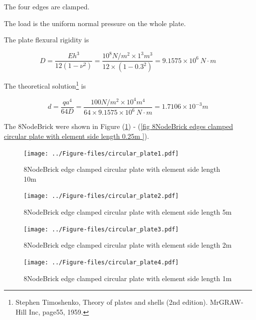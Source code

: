 \documentclass[fleqn,11pt]{article}
\begin{document}
The four edges are clamped. 

The load is the uniform normal pressure on the whole plate. 


The plate flexural rigidity is 

\begin{equation}
  D=\frac{Eh^3}{12(1-\nu^2)}=\frac{10^8 N/m^2 \times 1^3 m^3 }{12 \times (1-0.3^2) }= 9.1575 \times 10^6 \ N\cdot m
\end{equation}

The theoretical solution\footnote{Stephen Timoshenko, Theory of plates and shells (2nd edition). MrGRAW-Hill Inc, page55, 1959.} is 

\begin{equation}
  d= \frac{q a^4}{64D}=\frac{100 N/m^2 \times 10^4 m^4}{64 \times 9.1575 \times 10^6 \ N\cdot m}=1.7106\times 10^{-3} m
\end{equation}



The 8NodeBrick were shown in Figure (\ref{fig 8NodeBrick edges clamped circular plate with element side length 10m }) - (\ref{fig 8NodeBrick edges clamped circular plate with element side length 0.25m }). 




\begin{figure}[H]
  \centering
  \texttt{[image: ../Figure-files/circular\_plate1.pdf]}
  \caption{8NodeBrick edge clamped circular plate with element side length 10m }
  \label{fig 8NodeBrick edges clamped circular plate with element side length 10m }
\end{figure}

\newpage

\begin{figure}[H]
  \centering
  \texttt{[image: ../Figure-files/circular\_plate2.pdf]}
  \caption{8NodeBrick edge clamped circular plate with element side length 5m }
  \label{fig 8NodeBrick edges clamped circular plate with element side length 5m }
\end{figure}


\begin{figure}[H]
  \centering
  \texttt{[image: ../Figure-files/circular\_plate3.pdf]}
  \caption{8NodeBrick edge clamped circular plate with element side length 2m }
  \label{fig 8NodeBrick edges clamped circular plate with element side length 2m }
\end{figure}

\newpage

\begin{figure}[H]
  \centering
  \texttt{[image: ../Figure-files/circular\_plate4.pdf]}
  \caption{8NodeBrick edge clamped circular plate with element side length 1m }
  \label{fig 8NodeBrick edges clamped circular plate with element side length 1m }
\end{figure}
\end{document}
